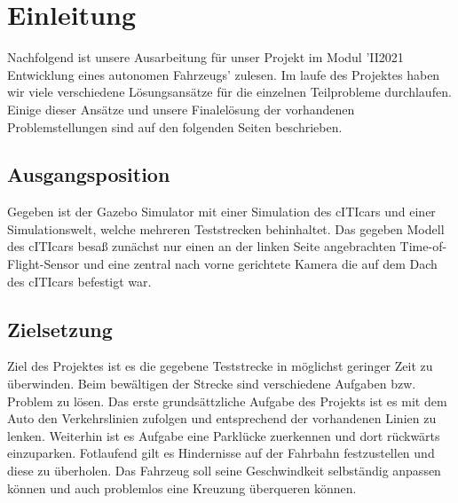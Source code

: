 \section{Einleitung}

Nachfolgend ist unsere Ausarbeitung für unser Projekt im Modul  'II2021 Entwicklung eines autonomen Fahrzeugs' zulesen. Im laufe des Projektes haben wir viele verschiedene Lösungsansätze für die einzelnen Teilprobleme durchlaufen. Einige dieser Ansätze und unsere Finalelösung der vorhandenen Problemstellungen sind auf den folgenden Seiten beschrieben.

\subsection{Ausgangsposition}
    
Gegeben ist der Gazebo Simulator mit einer Simulation des cITIcars und einer Simulationswelt, welche mehreren Teststrecken behinhaltet. Das gegeben Modell des cITIcars besaß zunächst nur einen an der linken Seite angebrachten Time-of-Flight-Sensor und eine zentral nach vorne gerichtete Kamera die auf dem Dach des cITIcars befestigt war.

\subsection{Zielsetzung}

Ziel des Projektes ist es die gegebene Teststrecke in möglichst geringer Zeit zu überwinden. Beim bewältigen der Strecke sind verschiedene Aufgaben bzw. Problem zu lösen. Das erste grundsättzliche Aufgabe des Projekts ist es mit dem Auto den Verkehrslinien zufolgen und entsprechend der vorhandenen Linien   zu lenken. Weiterhin ist es Aufgabe eine Parklücke zuerkennen und dort rückwärts einzuparken. Fotlaufend gilt es Hindernisse auf der Fahrbahn festzustellen und diese zu überholen. Das Fahrzeug soll seine Geschwindkeit selbständig anpassen können und auch problemlos eine Kreuzung überqueren können. 